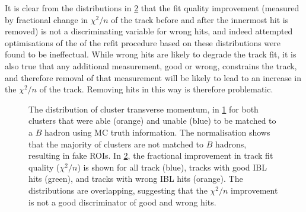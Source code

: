 It is clear from the distributions in \cref{fig:refit chi2 dists} that the fit quality improvement (measured by fractional change in $\chi^2/n$ of the track before and after the innermost hit is removed) is not a discriminating variable for wrong hits, and indeed attempted optimisations of the of the refit procedure based on these distributions were found to be ineffectual. While wrong hits are likely to degrade the track fit, it is also true that any additional measurement, good or wrong, constrains the track, and therefore removal of that measurement will be likely to lead to an increase in the $\chi^2/n$ of the track. Removing hits in this way is therefore problematic.
%
\begin{figure}[!htbp]
    \centering
    \begin{subfigure}{.4\textwidth}
      \centering
      \caption{}
      \label{fig:cluster purity in pt}
    \end{subfigure}%
    \begin{subfigure}{.4\textwidth}
      \centering
      \caption{}
      \label{fig:refit chi2 dists}
    \end{subfigure}
    \caption{The distribution of cluster transverse momentum, in \cref{fig:cluster purity in pt} for both clusters that were able (orange) and unable (blue) to be matched to a $B$ hadron using MC truth information. The normalisation shows that the majority of clusters are not matched to $B$ hadrons, resulting in fake ROIs. In \cref{fig:refit chi2 dists}, the fractional improvement in track fit quality ($\chi^2/n$) is shown for all track (blue), tracks with good IBL hits (green), and tracks with wrong IBL hits (orange). The distributions are overlapping, suggesting that the $\chi^2/n$ improvement is not a good discriminator of good and wrong hits.}
    \label{fig:cluster chi2 info}
\end{figure}
%

